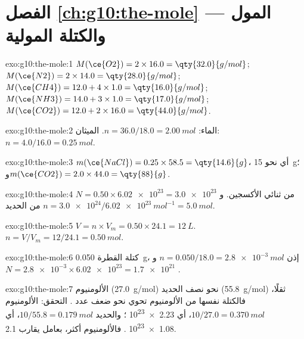 \section*{الفصل \ref{ch:g10:the-mole} --- المول والكتلة المولية}

\begin{solution}{exo:g10:the-mole:1}
$M(\ce{O2}) = 2 \times 16.0 = \qty{32.0}{g/mol}$;
$M(\ce{N2}) = 2 \times 14.0 = \qty{28.0}{g/mol}$;
$M(\ce{CH4}) = 12.0 + 4 \times 1.0 = \qty{16.0}{g/mol}$;
$M(\ce{NH3}) = 14.0 + 3 \times 1.0 = \qty{17.0}{g/mol}$;
$M(\ce{CO2}) = 12.0 + 2 \times 16.0 = \qty{44.0}{g/mol}$.
\end{solution}

\begin{solution}{exo:g10:the-mole:2}
الماء: $n = 36.0 / 18.0 = \qty{2.00}{mol}$. الميثان:
$n = 4.0 / 16.0 = \qty{0.25}{mol}$.
\end{solution}

\begin{solution}{exo:g10:the-mole:3}
$m(\ce{NaCl}) = 0.25 \times 58.5 = \qty{14.6}{g}$، أي نحو \qty{15}{g}؛
و$m(\ce{CO2}) = 2.0 \times 44.0 = \qty{88}{g}$.
\end{solution}

\begin{solution}{exo:g10:the-mole:4}
$N = 0.50 \times \num{6.02e23} = \num{3.0e23}$  من ثنائي الأكسجين.
و$n = \num{3.0e24} / \qty{6.02e23}{mol^{-1}} = \qty{5.0}{mol}$ من الحديد.
\end{solution}

\begin{solution}{exo:g10:the-mole:5}
$V = n \times V_m = 0.50 \times 24.1 = \qty{12}{L}$.
$n = V / V_m = 12 / 24.1 = \qty{0.50}{mol}$.
\end{solution}

\begin{solution}{exo:g10:the-mole:6}
كتلة القطرة \qty{0.050}{g}، إذن
$n = 0.050 / 18.0 = \qty{2.8e-3}{mol}$
و$N = \num{2.8e-3} \times \num{6.02e23} = \num{1.7e21}$ .
\end{solution}

\begin{solution}{exo:g10:the-mole:7}
 الألومنيوم (\qty{27.0}{g/mol}) نحو نصف  الحديد
(\qty{55.8}{g/mol}) ثقلًا، فالكتلة نفسها من الألومنيوم تحوي نحو ضعف عدد
. التحقق: الألومنيوم $10/27.0 = \qty{0.370}{mol}$، أي
\num{2.23e23} ؛ والحديد $10/55.8 = \qty{0.179}{mol}$، أي
\num{1.08e23} . فالألومنيوم أكثر، بعامل يقارب 2.1.
\end{solution}

